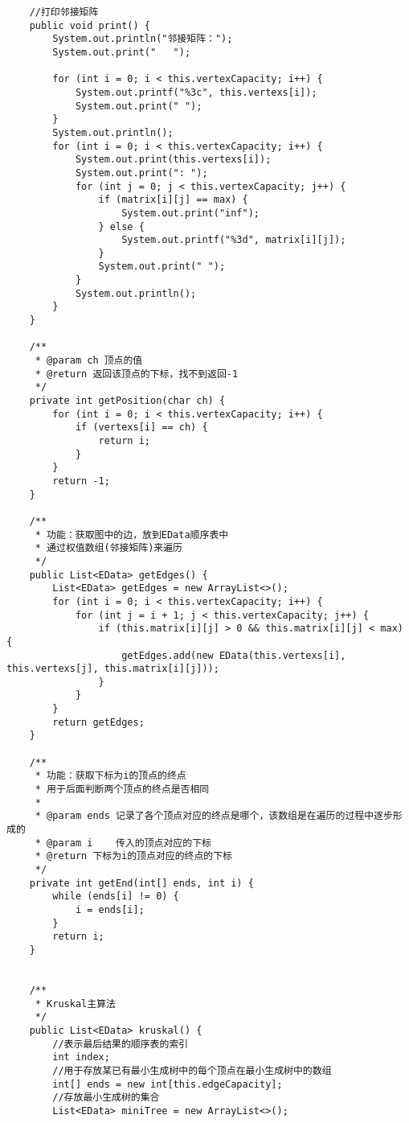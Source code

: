 \documentclass[a4paper]{report}
\begin{document}
\begin{lstlisting}
    //打印邻接矩阵
    public void print() {
        System.out.println("邻接矩阵：");
        System.out.print("   ");

        for (int i = 0; i < this.vertexCapacity; i++) {
            System.out.printf("%3c", this.vertexs[i]);
            System.out.print(" ");
        }
        System.out.println();
        for (int i = 0; i < this.vertexCapacity; i++) {
            System.out.print(this.vertexs[i]);
            System.out.print(": ");
            for (int j = 0; j < this.vertexCapacity; j++) {
                if (matrix[i][j] == max) {
                    System.out.print("inf");
                } else {
                    System.out.printf("%3d", matrix[i][j]);
                }
                System.out.print(" ");
            }
            System.out.println();
        }
    }

    /**
     * @param ch 顶点的值
     * @return 返回该顶点的下标，找不到返回-1
     */
    private int getPosition(char ch) {
        for (int i = 0; i < this.vertexCapacity; i++) {
            if (vertexs[i] == ch) {
                return i;
            }
        }
        return -1;
    }

    /**
     * 功能：获取图中的边，放到EData顺序表中
     * 通过权值数组(邻接矩阵)来遍历
     */
    public List<EData> getEdges() {
        List<EData> getEdges = new ArrayList<>();
        for (int i = 0; i < this.vertexCapacity; i++) {
            for (int j = i + 1; j < this.vertexCapacity; j++) {
                if (this.matrix[i][j] > 0 && this.matrix[i][j] < max) {
                    getEdges.add(new EData(this.vertexs[i], this.vertexs[j], this.matrix[i][j]));
                }
            }
        }
        return getEdges;
    }

    /**
     * 功能：获取下标为i的顶点的终点
     * 用于后面判断两个顶点的终点是否相同
     *
     * @param ends 记录了各个顶点对应的终点是哪个，该数组是在遍历的过程中逐步形成的
     * @param i    传入的顶点对应的下标
     * @return 下标为i的顶点对应的终点的下标
     */
    private int getEnd(int[] ends, int i) {
        while (ends[i] != 0) {
            i = ends[i];
        }
        return i;
    }


    /**
     * Kruskal主算法
     */
    public List<EData> kruskal() {
        //表示最后结果的顺序表的索引
        int index;
        //用于存放某已有最小生成树中的每个顶点在最小生成树中的数组
        int[] ends = new int[this.edgeCapacity];
        //存放最小生成树的集合
        List<EData> miniTree = new ArrayList<>();


\end{lstlisting}
\end{document}
